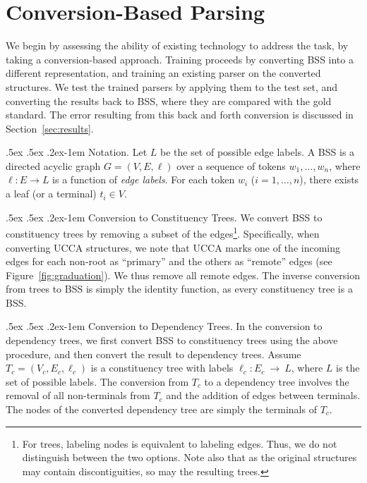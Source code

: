 \documentclass[11pt]{article}
\makeatletter
\newcommand{\secref}[1]{Section~\ref{#1}}
\newcommand{\figref}[1]{Figure~\ref{#1}}
\renewcommand{\paragraph}{
  \@startsection{paragraph}{4}
  {\z@}{.5ex \@plus .5ex \@minus .2ex}{-1em}
  {\normalfont\normalsize\bfseries}
}
\makeatother
\begin{document}
\section{Conversion-Based Parsing}\label{sec:conversion_approach}

We begin by assessing the ability of existing technology to address the task,
by taking a conversion-based approach. Training proceeds by 
converting BSS into a different representation,
and training an existing parser on the converted structures.
We test the trained parsers by applying them to the test set,
and converting the results back to BSS, where they are compared
with the gold standard.
The error resulting from this back and forth conversion is discussed in
\secref{sec:results}.

\paragraph{Notation.}
Let $L$ be the set of possible edge labels.
A BSS is a directed acyclic graph $G=(V,E, \ell)$
over a sequence of tokens $w_1, \ldots, w_n$,
where $\ell:E\to L$ is a function of \textit{edge labels}.
For each token $w_i$ ($i=1, \ldots, n$), there exists a leaf (or a terminal) $t_i \in V$.

\paragraph{Conversion to Constituency Trees.}
We convert BSS to constituency trees by removing a subset of the
edges\footnote{For trees, labeling nodes is equivalent to labeling edges. Thus,
  we do not distinguish between the two options. 
  Note also that as the original structures may contain discontiguities, so may the resulting trees.}.
Specifically, when converting UCCA structures, we note that UCCA marks one of the incoming edges
for each non-root as ``primary'' and the others as ``remote'' edges (see \figref{fig:graduation}).
We thus remove all remote edges.
The inverse conversion from trees to BSS is simply the identity function, as every constituency tree is a BSS.

\paragraph{Conversion to Dependency Trees.}\label{subsec:con2dep}
In the conversion to dependency trees, we first convert BSS
to constituency trees using the above procedure, and then convert the result to dependency trees. 
Assume $T_c=(V_c,E_c,\ell_c)$ is a constituency tree with labels $\ell_c:E_c~\rightarrow~L$,
where $L$ is the set of possible labels.
The conversion from $T_c$ to a dependency tree involves the removal of
all non-terminals from $T_c$ and the addition of edges between terminals.
The nodes of the converted dependency tree are simply the terminals of $T_c$.
\end{document}
